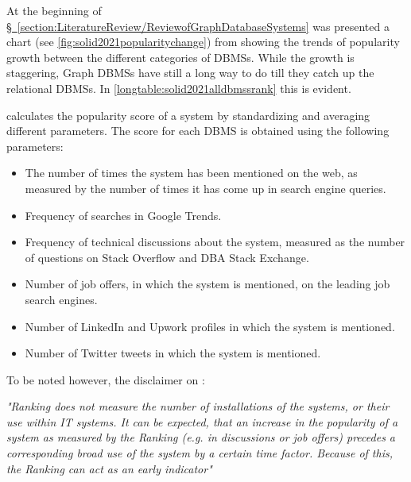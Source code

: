 At the beginning of \hyperref[section:LiteratureReview/ReviewofGraphDatabaseSystems]{\S\ \ref{section:LiteratureReview/ReviewofGraphDatabaseSystems}} was presented a chart (see \hyperref[fig:solid2021popularitychange]{\autoref{fig:solid2021popularitychange}}) from 
 showing the trends of popularity growth between the different categories of DBMSs.
While the growth is staggering, Graph DBMSs have still a long way to do till they catch up the relational DBMSs.
In \hyperref[longtable:solid2021alldbmssrank]{\autoref{longtable:solid2021alldbmssrank}} this is evident.

 calculates the popularity score of a system by standardizing and averaging different parameters. The score for each DBMS is obtained using the following parameters:
 \begin{itemize}[noitemsep]
	\item The number of times the system has been mentioned on the web, as measured by the number of times it has come up in search engine queries.
	\item Frequency of searches in Google Trends.
	\item Frequency of technical discussions about the system, measured as the number of questions on Stack Overflow and DBA Stack Exchange.
	\item Number of job offers, in which the system is mentioned, on the leading job search engines.
	\item Number of \gls{LinkedIn} and \gls{Upwork} profiles in which the system is mentioned.
	\item Number of \gls{Twitter} tweets in which the system is mentioned.
\end{itemize}

To be noted however, the disclaimer on :
\begin{quoting}[
	begintext={},
	endtext={\sfcite{solid2021}}
]
	\textit{
		"Ranking does not measure the number of installations of the systems, or their use within IT systems.
		It can be expected, that an increase in the popularity of a system as measured by the \textnormal{} Ranking (e.g. in discussions or job offers) precedes a corresponding broad use of the system by a certain time factor.
		Because of this, the \textnormal{} Ranking can act as an early indicator"
	}
\end{quoting}

